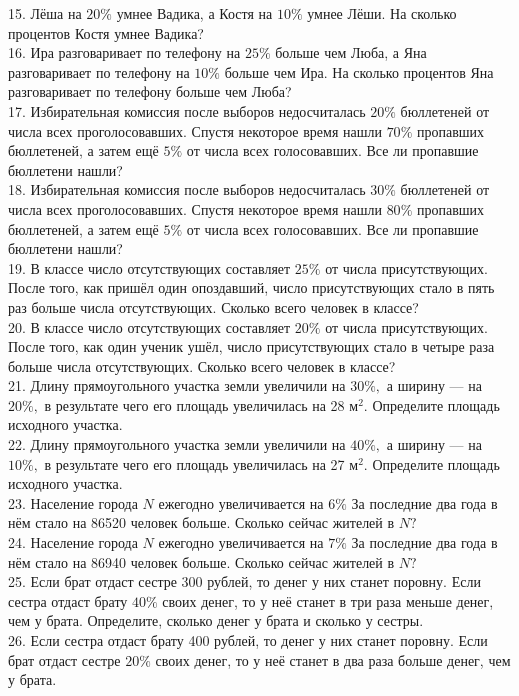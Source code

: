 15. Лёша на $20\%$ умнее Вадика, а Костя на $10\%$ умнее Лёши. На сколько процентов Костя умнее Вадика?\\
16. Ира разговаривает по телефону на $25\%$ больше чем Люба, а Яна разговаривает по телефону на $10\%$ больше чем Ира. На сколько процентов Яна разговаривает по телефону больше чем Люба?\\
17. Избирательная комиссия после выборов недосчиталась $20\%$ бюллетеней от числа всех
проголосовавших. Спустя некоторое время нашли $70\%$ пропавших бюллетеней, а затем
ещё $5\%$ от числа всех голосовавших. Все ли пропавшие бюллетени нашли?\\
18. Избирательная комиссия после выборов недосчиталась $30\%$ бюллетеней от числа всех
проголосовавших. Спустя некоторое время нашли $80\%$ пропавших бюллетеней, а затем
ещё $5\%$ от числа всех голосовавших. Все ли пропавшие бюллетени нашли? \\
19. В классе число отсутствующих составляет $25\%$ от числа присутствующих. После того, как пришёл один опоздавший, число присутствующих стало в пять раз больше числа отсутствующих. Сколько всего человек в классе?\\
20. В классе число отсутствующих составляет $20\%$ от числа присутствующих. После того, как один ученик ушёл, число присутствующих стало в четыре раза больше числа отсутствующих. Сколько всего человек в классе?\\
21. Длину прямоугольного участка земли увеличили на $30\%,$ а ширину --- на $20\%,$ в результате чего его площадь увеличилась на 28 $\text{м}^2.$ Определите площадь исходного участка.\\
22. Длину прямоугольного участка земли увеличили на $40\%,$ а ширину --- на $10\%,$ в результате чего его площадь увеличилась на 27 $\text{м}^2.$ Определите площадь исходного участка.\\
23. Население города $N$ ежегодно увеличивается на $6\%$ За последние два года в нём стало на 86520 человек больше. Сколько сейчас жителей в $N?$\\
24. Население города $N$ ежегодно увеличивается на $7\%$ За последние два года в нём стало на 86940 человек больше. Сколько сейчас жителей в $N?$\\
25. Если брат отдаст сестре 300 рублей, то денег у них станет поровну. Если сестра отдаст брату $40\%$ своих денег, то у неё станет в три раза меньше денег, чем у брата.
Определите, сколько денег у брата и сколько у сестры.\\
26. Если сестра отдаст брату 400 рублей, то денег у них станет поровну. Если брат отдаст сестре $20\%$ своих денег, то у неё станет в два раза больше денег, чем у брата.
